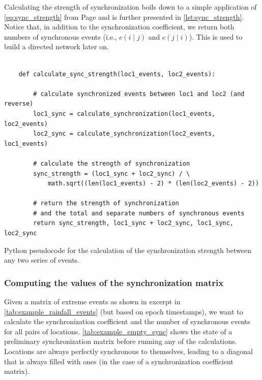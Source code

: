 Calculating the strength of synchronization boils down to a simple application of \cref{eq:sync_strength} from Page \pageref{eq:sync_strength} and is further presented in \cref{lst:sync_strength}. Notice that, in addition to the synchronization coefficient, we return both numbers of synchronous events (i.e., $c(i \mid j)$ and $c(j \mid i)$). This is used to build a directed network later on.

\begin{listing}[h]
  \begin{verbatim}

    def calculate_sync_strength(loc1_events, loc2_events):

        # calculate synchronized events between loc1 and loc2 (and reverse)
        loc1_sync = calculate_synchronization(loc1_events, loc2_events)
        loc2_sync = calculate_synchronization(loc2_events, loc1_events)

        # calculate the strength of synchronization
        sync_strength = (loc1_sync + loc2_sync) / \
            math.sqrt((len(loc1_events) - 2) * (len(loc2_events) - 2))

        # return the strength of synchronization
        # and the total and separate numbers of synchronous events
        return sync_strength, loc1_sync + loc2_sync, loc1_sync, loc2_sync

  \end{verbatim}
  \caption{Python pseudocode for the calculation of the synchronization strength between any two series of events.}
  \label{lst:sync_strength}
\end{listing}

\subsubsection{Computing the values of the synchronization matrix}
Given a matrix of extreme events as shown in excerpt in \cref{tab:example_rainfall_events} (but based on epoch timestamps), we want to calculate the synchronization coefficient and the number of synchronous events for all pairs of locations. \cref{tab:example_empty_sync} shows the state of a preliminary synchronization matrix before running any of the calculations. Locations are always perfectly synchronous to themselves, leading to a diagonal that is always filled with ones (in the case of a synchronization coefficient matrix).

